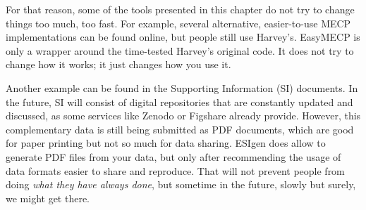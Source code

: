 For that reason, some of the tools presented in this chapter do not try to change things too much, too fast. For example, several alternative, easier-to-use MECP implementations can be found online,\cite{mecpro,mecpy,sobmecp} but people still use Harvey's. EasyMECP is only a wrapper around the time-tested Harvey's original code. It does not try to change how it works; it just changes how you use it.

Another example can be found in the Supporting Information (SI) documents. In the future, SI will consist of digital repositories that are constantly updated and discussed, as some services like Zenodo\cite{zenodo} or Figshare\cite{figshare} already provide. However, this complementary data is still being submitted as PDF documents, which are good for paper printing but not so much for data sharing. ESIgen does allow to generate PDF files from your data, but only after recommending the usage of data formats easier to share and reproduce. That will not prevent people from doing \textit{what they have always done}, but sometime in the future, slowly but surely, we might get there.
